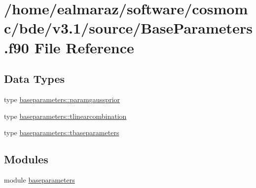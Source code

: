 \hypertarget{BaseParameters_8f90}{}\section{/home/ealmaraz/software/cosmomc/bde/v3.1/source/\+Base\+Parameters.f90 File Reference}
\label{BaseParameters_8f90}
\subsection*{Data Types}
\begin{DoxyCompactItemize}
\item 
type \mbox{\hyperlink{structbaseparameters_1_1paramgaussprior}{baseparameters\+::paramgaussprior}}
\item 
type \mbox{\hyperlink{structbaseparameters_1_1tlinearcombination}{baseparameters\+::tlinearcombination}}
\item 
type \mbox{\hyperlink{structbaseparameters_1_1tbaseparameters}{baseparameters\+::tbaseparameters}}
\end{DoxyCompactItemize}
\subsection*{Modules}
\begin{DoxyCompactItemize}
\item 
module \mbox{\hyperlink{namespacebaseparameters}{baseparameters}}
\end{DoxyCompactItemize}
